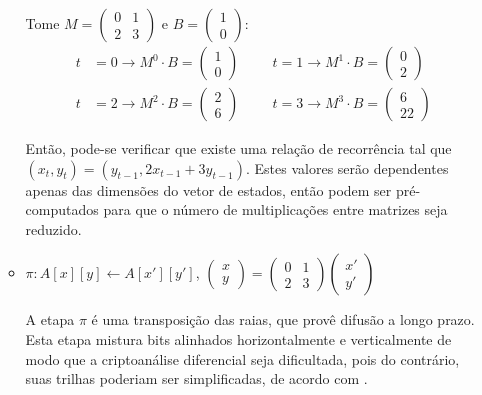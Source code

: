 \documentclass{article}
\begin{document}
\begin{enumerate}[label=(\alph*)]
\begin{itemize}
Tome $M = \begin{pmatrix} 0 & 1 \\ 2 & 3 \end{pmatrix}$ e
$B = \begin{pmatrix} 1 \\ 0 \end{pmatrix}$:
\begin{align*}
    t &= 0 \longrightarrow M^{0} \cdot B
        = \begin{pmatrix} 1 \\ 0 \end{pmatrix} \hspace{1cm}
    t = 1 \longrightarrow M^{1} \cdot B
        = \begin{pmatrix} 0 \\ 2 \end{pmatrix} \\
    t &= 2 \longrightarrow M^{2} \cdot B
        = \begin{pmatrix} 2 \\ 6 \end{pmatrix} \hspace{1cm}
    t = 3 \longrightarrow M^{3} \cdot B
        = \begin{pmatrix} 6 \\ 22 \end{pmatrix}
\end{align*}

Então, pode-se verificar que existe uma relação de recorrência tal que
$(x_{t}, y_{t}) = (y_{t-1}, 2x_{t-1} + 3y_{t-1})$. Estes valores serão
dependentes apenas das dimensões do vetor de estados, então podem ser
pré-computados para que o número de multiplicações entre matrizes seja
reduzido.

\item $\pi : A[x][y] \longleftarrow A[x'][y']$,
    $\begin{pmatrix} x \\ y \end{pmatrix}
    = \begin{pmatrix} 0 & 1 \\ 2 & 3 \end{pmatrix}
    \begin{pmatrix} x' \\ y' \end{pmatrix}$

A etapa $\pi$ é uma transposição das raias, que provê difusão a longo prazo.
Esta etapa mistura bits alinhados horizontalmente e verticalmente de modo que
a criptoanálise diferencial seja dificultada, pois do contrário, suas trilhas
poderiam ser simplificadas, de acordo com \cite{KeccakDC}.


\end{itemize}
\end{enumerate}
\end{document}
